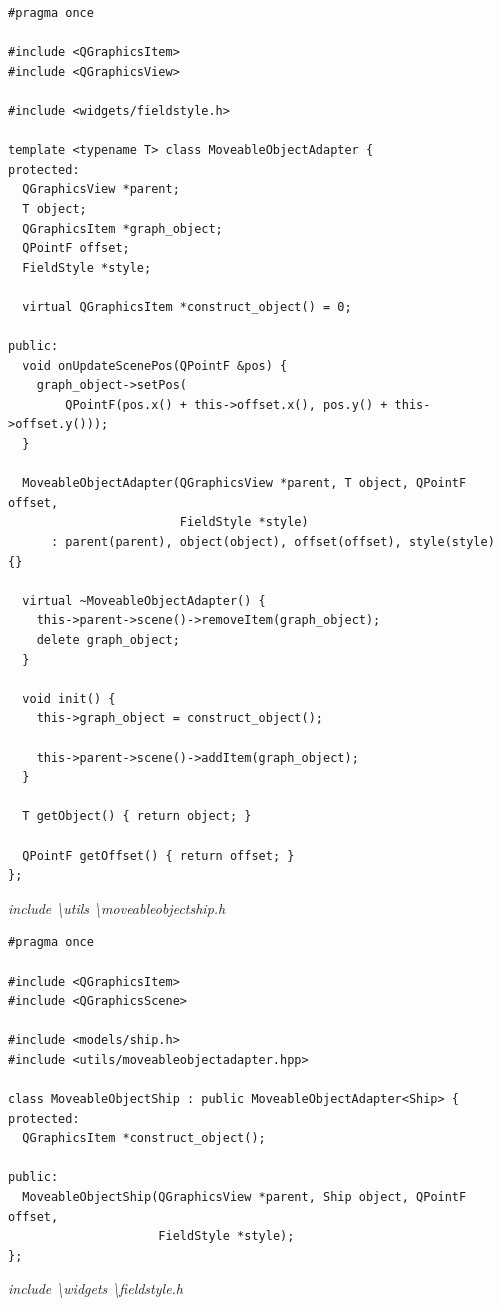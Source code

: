 \documentclass[a4paper,14pt]{extarticle}
\begin{document}
\begin{verbatim}
#pragma once

#include <QGraphicsItem>
#include <QGraphicsView>

#include <widgets/fieldstyle.h>

template <typename T> class MoveableObjectAdapter {
protected:
  QGraphicsView *parent;
  T object;
  QGraphicsItem *graph_object;
  QPointF offset;
  FieldStyle *style;

  virtual QGraphicsItem *construct_object() = 0;

public:
  void onUpdateScenePos(QPointF &pos) {
    graph_object->setPos(
        QPointF(pos.x() + this->offset.x(), pos.y() + this->offset.y()));
  }

  MoveableObjectAdapter(QGraphicsView *parent, T object, QPointF offset,
                        FieldStyle *style)
      : parent(parent), object(object), offset(offset), style(style) {}

  virtual ~MoveableObjectAdapter() {
    this->parent->scene()->removeItem(graph_object);
    delete graph_object;
  }

  void init() {
    this->graph_object = construct_object();

    this->parent->scene()->addItem(graph_object);
  }

  T getObject() { return object; }

  QPointF getOffset() { return offset; }
};

\end{verbatim}
\textit{include \textbackslash utils \textbackslash moveableobjectship.h}
\begin{verbatim}
#pragma once

#include <QGraphicsItem>
#include <QGraphicsScene>

#include <models/ship.h>
#include <utils/moveableobjectadapter.hpp>

class MoveableObjectShip : public MoveableObjectAdapter<Ship> {
protected:
  QGraphicsItem *construct_object();

public:
  MoveableObjectShip(QGraphicsView *parent, Ship object, QPointF offset,
                     FieldStyle *style);
};

\end{verbatim}
\textit{include \textbackslash widgets \textbackslash fieldstyle.h}
\end{document}
